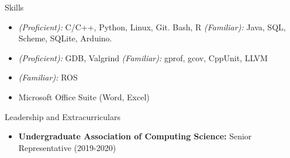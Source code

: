 \documentclass[]{mcdowellcv}
\begin{document}
\begin{cvsection}{Skills}
  \begin{cvsubsection}{}{}{}	
    \begin{itemize}
      \item \emph{(Proficient):} C/C++, Python, Linux, Git. Bash, R  
            \emph{(Familiar):} Java, SQL, Scheme, SQLite, Arduino.
      \item \emph{(Proficient):} GDB, Valgrind
            \emph{(Familiar):} gprof, gcov, CppUnit, LLVM
      \item \emph{(Familiar):} ROS      
      \item Microsoft Office Suite (Word, Excel)
    \end{itemize}
  \end{cvsubsection}
\end{cvsection}

\begin{cvsection}{Leadership and Extracurriculars}{}{}
  \begin{cvsubsection}
    {}{}{}
    \begin{itemize}
      \item \textbf{Undergraduate Association of Computing Science:} Senior Representative (2019-2020)  
    \end{itemize}
  \end{cvsubsection}
\end{cvsection}
\end{document}
